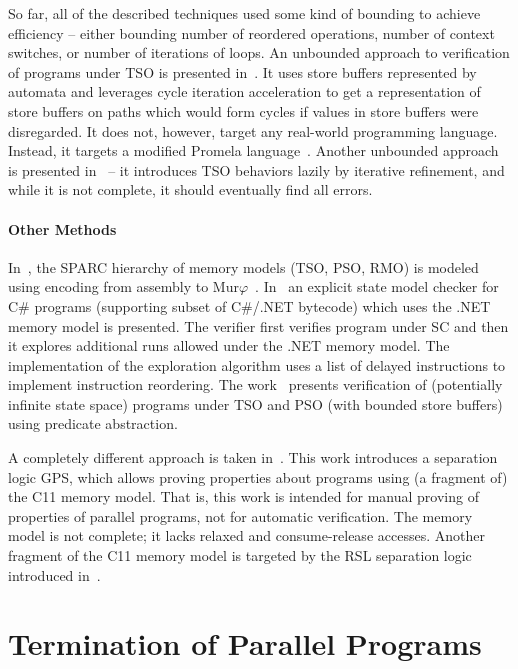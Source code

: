 So far, all of the described techniques used some kind of bounding to achieve efficiency -- either bounding number of reordered operations, number of context switches, or number of iterations of loops.
An unbounded approach to verification of programs under TSO is presented in~\cite{Linden2010}.
It uses store buffers represented by automata and leverages cycle iteration acceleration to get a representation of store buffers on paths which would form cycles if values in store buffers were disregarded.
It does not, however, target any real-world programming language.
Instead, it targets a modified Promela language~\cite{Holzmann1997}.
Another unbounded approach is presented in~\cite{Bouajjani2015} -- it introduces TSO behaviors lazily by iterative refinement, and while it is not complete, it should eventually find all errors.

\paragraph{Other Methods}\label{other-methods}

In~\cite{Park1995}, the SPARC hierarchy of memory models (TSO, PSO, RMO) is modeled using encoding from assembly to Mur\(\varphi\)~\cite{Murphi}.
In~\cite{Huynh2006} an explicit state model checker for C\# programs (supporting subset of C\#/.NET bytecode) which uses the .NET memory model is presented.
The verifier first verifies program under SC and then it explores additional runs allowed under the .NET memory model.
The implementation of the exploration algorithm uses a list of delayed instructions to implement instruction reordering.
The work~\cite{Dan2013} presents verification of (potentially infinite state space) programs under TSO and PSO (with bounded store buffers) using predicate abstraction.

A completely different approach is taken in~\cite{Turon2014}.
This work introduces a separation logic GPS, which allows proving properties about programs using (a fragment of) the C11 memory model.
That is, this work is intended for manual proving of properties of parallel programs, not for automatic verification.
The memory model is not complete; it lacks relaxed and consume-release accesses.
Another fragment of the C11 memory model is targeted by the RSL separation logic introduced in~\cite{Vafeiadis2013}.

\section{Termination of Parallel Programs}

